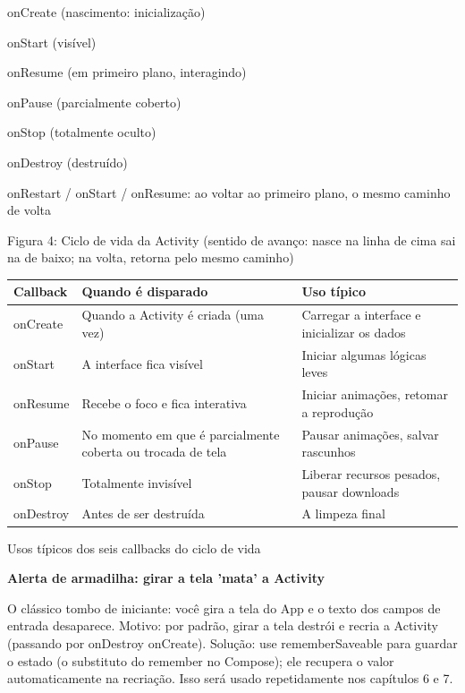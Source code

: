 onCreate (nascimento: inicialização)

onStart (visível)

onResume (em primeiro plano, interagindo)

onPause (parcialmente coberto)

onStop (totalmente oculto)

onDestroy (destruído)

onRestart / onStart / onResume: ao voltar ao primeiro plano, o mesmo caminho de volta

\begin{center}\small\color{gray}Figura 4: Ciclo de vida da Activity (sentido de avanço: nasce na linha de cima sai na de baixo; na volta, retorna pelo mesmo caminho)\end{center}

\begin{center}
\begin{tabularx}{\linewidth}{|X|X|X|}
\hline
\textbf{Callback} & \textbf{Quando é disparado} & \textbf{Uso típico} \tabularnewline
\hline
onCreate & Quando a Activity é criada (uma vez) & Carregar a interface e inicializar os dados \tabularnewline
onStart & A interface fica visível & Iniciar algumas lógicas leves \tabularnewline
onResume & Recebe o foco e fica interativa & Iniciar animações, retomar a reprodução \tabularnewline
onPause & No momento em que é parcialmente coberta ou trocada de tela & Pausar animações, salvar rascunhos \tabularnewline
onStop & Totalmente invisível & Liberar recursos pesados, pausar downloads \tabularnewline
onDestroy & Antes de ser destruída & A limpeza final \tabularnewline
\hline
\end{tabularx}
\end{center}

\begin{center}\small\color{gray}Usos típicos dos seis callbacks do ciclo de vida\end{center}

\textbf{Alerta de armadilha: girar a tela 'mata' a Activity}\par

O clássico tombo de iniciante: você gira a tela do App e o texto dos campos de entrada desaparece. Motivo: por padrão, girar a tela destrói e recria a Activity (passando por onDestroy onCreate). Solução: use rememberSaveable para guardar o estado (o substituto do remember no Compose); ele recupera o valor automaticamente na recriação. Isso será usado repetidamente nos capítulos 6 e 7.

